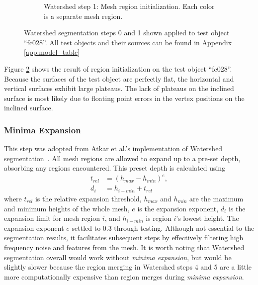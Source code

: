 \begin{figure}[htb]
\begin{subfigure}{0.45\textwidth}
		\caption{Watershed step 1: Mesh region initialization. Each color is a separate mesh region.}
		\label{sfig:ws_1}
	\end{subfigure}
\caption{
Watershed segmentation steps 0 and 1 shown applied to test object ``fc028''.
All test objects and their sources can be found in Appendix \ref{app:model_table}
}
\end{figure}

Figure \ref{sfig:ws_1} shows the result of region initialization on the test object ``fc028''.
Because the surfaces of the test object are perfectly flat, the horizontal and vertical surfaces exhibit large plateaus.
The lack of plateaus on the inclined surface is most likely due to floating point errors in the vertex positions on the inclined surface.

\subsubsection{Minima Expansion}
This step was adopted from Atkar et al.'s implementation of Watershed segmentation~\cite{HierSurfSeg_for_autobody_painting}.
All mesh regions are allowed to expand up to a pre-set depth, absorbing any regions encountered.
This preset depth is calculated using
\begin{align*}
	t_{rel} &= \left(h_{max} - h_{min}\right)^{e}, \\
	d_i &= h_{i-min} + t_{rel}
\end{align*}
where $t_{rel}$ is the relative expansion threshold, $h_{max}$ and $h_{min}$ are the maximum and minimum heights of the whole mesh, $e$ is the expansion exponent, $d_i$ is the expansion limit for mesh region $i$, and $h_{i-min}$ is region $i$'s lowest height.
The expansion exponent $e$ settled to 0.3 through testing.
Although not essential to the segmentation results, it facilitates subsequent steps by effectively filtering high frequency noise and features from the mesh.
It is worth noting that Watershed segmentation overall would work without \textit{minima expansion}, but would be slightly slower because the region merging in Watershed steps 4 and 5 are a little more computationally expensive than region merges during \textit{minima expansion}.

